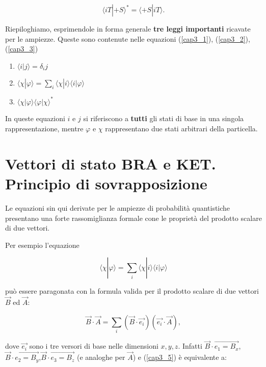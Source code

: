\documentclass[a4paper,12pt,oneside]{book}
\begin{document}
\begin{equation}
 \langle iT | +S \rangle ^* = \langle +S | iT \rangle .
 \label{cap3_3}
\end{equation}

Riepiloghiamo, esprimendole in forma generale \textbf{tre leggi importanti} ricavate per le ampiezze.
Queste sono contenute nelle equazioni (\ref{cap3_1}), (\ref{cap3_2}), (\ref{cap3_3})
\begin{enumerate}
\item $\langle i | j \rangle=\delta_ij$
\item $\langle \chi | \varphi \rangle=\sum \limits_{i} \langle \chi | i \rangle \langle i | \varphi \rangle$
\item $\langle \chi | \varphi \rangle \langle \varphi | \chi \rangle ^*$
\end{enumerate}

In queste equazioni $i$ e $j$ si riferiscono a \textbf{tutti} gli stati di base in una singola rappresentazione, mentre $\varphi$ e $\chi$ rappresentano due stati arbitrari della particella.

\section[Principio di sovrapposizione]{Vettori di stato BRA e KET. Principio di sovrapposizione} 

Le equazioni sin qui derivate per le ampiezze di probabilità quantistiche presentano una forte rassomiglianza formale cone le proprietà del prodotto scalare di due vettori.

Per esempio l'equazione

\begin{equation}
\langle \chi | \varphi \rangle =\sum \limits_{i}\langle \chi | i \rangle \langle i | \varphi \rangle
\label{cap3_4}
\end{equation}

può essere paragonata con la formula valida per il prodotto scalare di due vettori $\vec{B}$ ed $\vec{A}$:

\begin{equation}
\vec{B} \cdot \vec{A}= \sum \limits_{i} (\vec{B} \cdot  \vec{e_i})(\vec{e_i} \cdot \vec{A}) ,
\label{cap3_5}
\end{equation}

dove $\vec{e_i}$ sono i tre versori di base nelle dimensioni $x,y,z$. Infatti $\vec{B}\cdot \vec{e_1=B_x}$, $\vec{B}\cdot \vec{e_2=B_y}$,$\vec{B}\cdot \vec{e_3=B_z}$ (e analoghe per  $\vec{A}$) e (\eqref{cap3_5}) è equivalente a:
\end{document}
